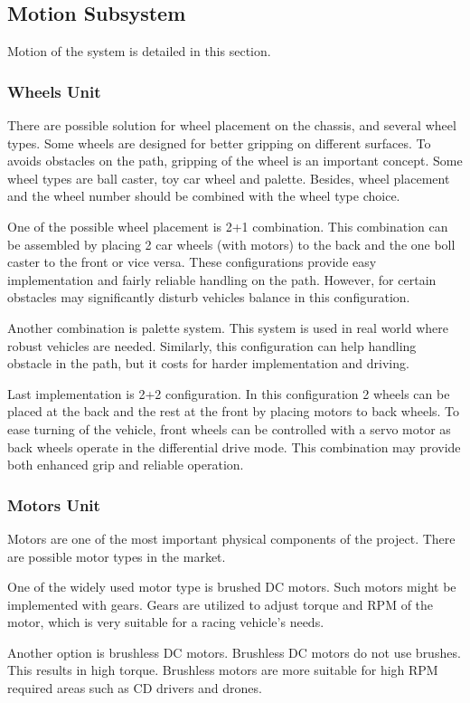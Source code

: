 \documentclass[a4paper,12pt]{article}
\begin{document}
\subsection{Motion Subsystem}
Motion of the system is detailed in this section.
\subsubsection{Wheels Unit}
There are possible solution for wheel placement on the chassis, and several wheel types. Some wheels are designed for better gripping on different surfaces. To avoids obstacles on the path, gripping of the wheel is an important concept. Some wheel types are ball caster, toy car wheel and palette. Besides, wheel placement and the wheel number should be combined with the wheel type choice. 

One of the possible wheel placement is 2+1 combination. This combination can be assembled by placing 2 car wheels (with motors) to the back and the one boll caster to the front or vice versa. These configurations provide easy implementation and fairly reliable handling on the path. However, for certain obstacles may significantly disturb vehicles balance in this configuration.

Another combination is palette system. This system is used in real world where robust vehicles are needed. Similarly, this configuration can help handling obstacle in the path, but it costs for harder implementation and driving.

Last implementation is 2+2 configuration. In this configuration 2 wheels can be placed at the back and the rest at the front by placing motors to back wheels. To ease turning of the vehicle, front wheels can be controlled with a servo motor as back wheels operate in the differential drive mode. This combination may provide both enhanced grip and reliable	 operation. 
\subsubsection{Motors Unit}
Motors are one of the most important physical components of the project. There are possible motor types in the market.

One of the widely used motor type is brushed DC motors. Such motors might be implemented with gears. Gears are utilized to adjust torque and RPM of the motor, which is very suitable for a racing vehicle's needs. 

Another option is brushless DC motors. Brushless DC motors do not use brushes. This results in high torque. Brushless motors are more suitable for high RPM required areas such as CD drivers and drones.
\end{document}
